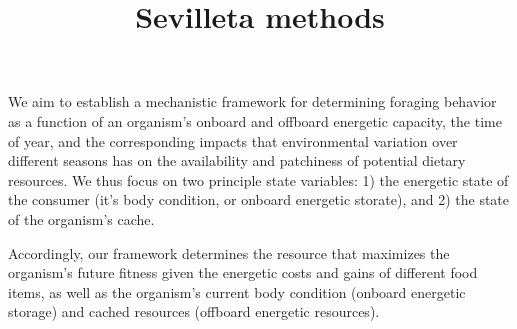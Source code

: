 \documentclass{article}
\begin{document}
  \title{Sevilleta methods}

  \maketitle

  We aim to establish a mechanistic framework for determining foraging behavior as a function of an organism's onboard and offboard energetic capacity, the time of year, and the corresponding impacts that environmental variation over different seasons has on the availability and patchiness of potential dietary resources.
  We thus focus on two principle state variables: 1) the energetic state of the consumer (it's body condition, or onboard energetic storate), and 2) the state of the organism's cache.
  





Accordingly, our framework determines the resource that maximizes the organism's future fitness given the energetic costs and gains of different food items, as well as the organism's current body condition (onboard energetic storage) and cached resources (offboard energetic resources).
\end{document}

